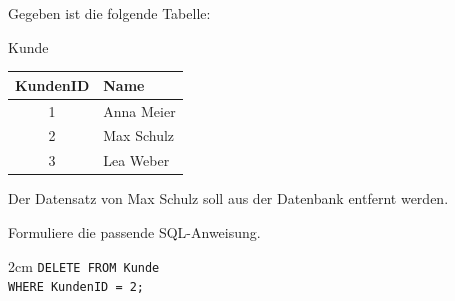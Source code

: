 \question[3]
Gegeben ist die folgende Tabelle:

Kunde \medskip

\begin{tabular}{|c|l|}
\hline
KundenID & Name \\
\hline
1 & Anna Meier \\
2 & Max Schulz \\
3 & Lea Weber \\
\hline
\end{tabular}


Der Datensatz von Max Schulz soll aus der Datenbank entfernt werden.

Formuliere die passende SQL-Anweisung.

\begin{solutionbox}{2cm}
\texttt{DELETE FROM Kunde}\\
\texttt{WHERE KundenID = 2;}
\end{solutionbox}